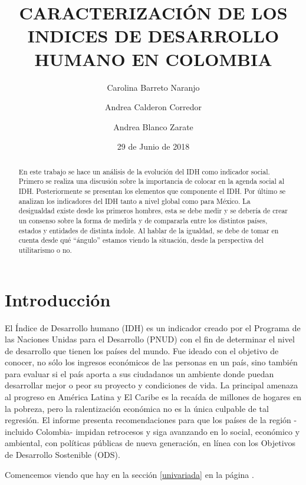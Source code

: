\documentclass{article}
\title{CARACTERIZACIÓN DE LOS INDICES DE DESARROLLO HUMANO EN COLOMBIA}
\author[1]{\normalsize Carolina Barreto Naranjo}
\author[2]{\normalsize Andrea Calderon Corredor}
\author[3]{\normalsize Andrea Blanco Zarate}
\affil[1,2,3]{\small  Facultad de Ingeniería,Universidad de los Andes\\
\texttt{{c.barreto805,a.calderon,a.blanco}@uniandes.edu.co}}
\affil[1,2,3]{\small Herramientas Computacionales para la Investigación\\}
\date{29 de Junio de 2018}
\begin{document}


\maketitle


\begin{abstract}
En este trabajo se hace un análisis de la evolución del IDH como indicador social. Primero se realiza una discusión sobre la importancia de colocar en la agenda social al IDH. Posteriormente se presentan los elementos que componente el IDH. Por último se analizan los indicadores del IDH tanto a nivel global como para México. La desigualdad existe desde los primeros hombres, esta se debe medir y se debería de crear un consenso sobre la forma de medirla y de compararla entre los distintos países, estados y entidades de distinta índole. Al hablar de la igualdad, se debe de tomar en cuenta desde qué “ángulo” estamos viendo la situación, desde la perspectiva del utilitarismo o no.
\end{abstract}

\section*{Introducción}

El Índice de Desarrollo humano (IDH) es un indicador creado por el Programa de las Naciones Unidas para el Desarrollo (PNUD) con el fin de determinar el nivel de desarrollo que tienen los países del mundo.  Fue ideado con el objetivo de conocer, no sólo los ingresos económicos de las personas en un país, sino también para evaluar si el país aporta a sus ciudadanos un ambiente donde puedan desarrollar mejor o peor su proyecto y condiciones de vida. La principal amenaza al progreso en América Latina y El Caribe es la recaída de millones de hogares en la pobreza, pero la ralentización económica no es la única culpable de tal regresión. El informe presenta recomendaciones para que los países de la región -incluido Colombia- impidan retrocesos y siga avanzando en lo social, económico y ambiental, con políticas públicas de nueva generación, en línea con los Objetivos de Desarrollo Sostenible (ODS).
 
Comencemos viendo que hay en la sección \ref{univariada} en la página \pageref{univariada}.

\clearpage



\clearpage



\clearpage


\clearpage




\renewcommand{\refname}{Bibliografia}

\end{document}
